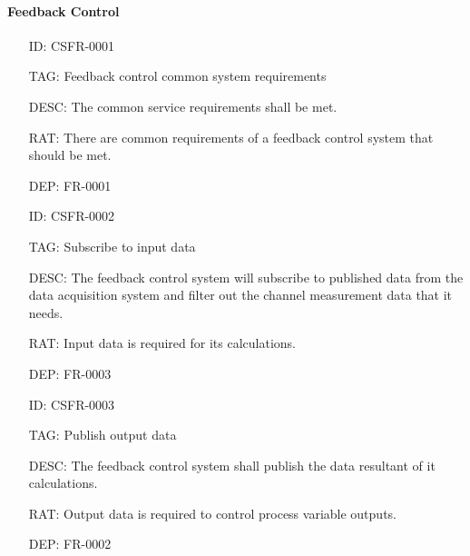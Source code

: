       \paragraph{Feedback Control}

        \begin{itemize}
          \setlength{\itemindent}{.5in}
          \itemsep .15em
          \item[ID:] CSFR-0001
          \item[TAG:] Feedback control common system requirements
          \item[DESC:] The common service requirements shall be met.
          \item[RAT:] There are common requirements of a feedback control system
            that should be met.
          \item[DEP:] FR-0001
        \end{itemize}

        \begin{itemize}
          \setlength{\itemindent}{.5in}
          \itemsep .15em
          \item[ID:] CSFR-0002
          \item[TAG:] Subscribe to input data
          \item[DESC:] The feedback control system will subscribe to
            published data from the data acquisition system and filter out
            the channel measurement data that it needs.
          \item[RAT:] Input data is required for its calculations.
          \item[DEP:] FR-0003
        \end{itemize}

        \begin{itemize}
          \setlength{\itemindent}{.5in}
          \itemsep .15em
          \item[ID:] CSFR-0003
          \item[TAG:] Publish output data
          \item[DESC:] The feedback control system shall publish the data
            resultant of it calculations.
          \item[RAT:] Output data is required to control process variable
            outputs.
          \item[DEP:] FR-0002
        \end{itemize}

        \newline

